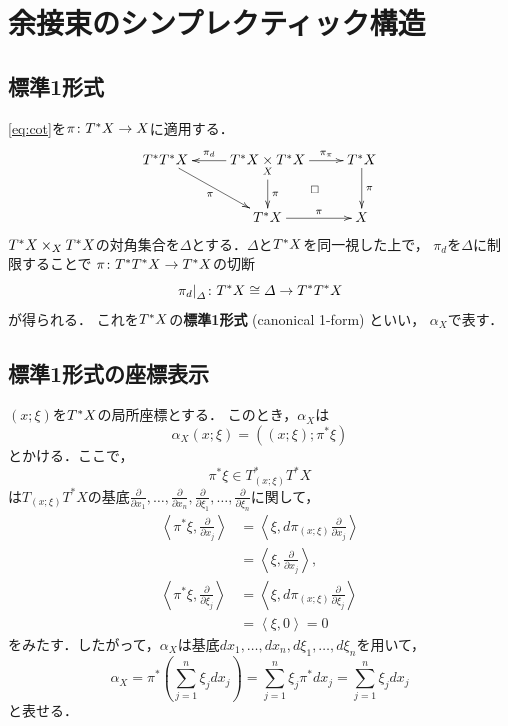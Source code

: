 \section{余接束のシンプレクティック構造}
\subsection*{標準1形式}

\eqref{eq:cot}を\(\pi\colon \cotb[X]\to X\)に適用する．
\begin{equation}\label{eq:cotcot}
    \vcenter{\xymatrix{
      T^{\ast}\cotb[X]
      \ar[rd]_-{\pi}
      &
      \cotb[X]\pb[X]\cotb[X]
      \ar[l]_-{\pi_{d}}
      \ar[r]^-{\pi_{\pi}}
      \ar[d]^-{\pi}
      \ar@{}[dr]|\square
      &
      \cotb[X]
      \ar[d]^-{\pi}
      \\
      &\cotb[X]\ar[r]^-{\pi}&X
}}\end{equation}
\(\cotb[X]\mathbin{\times_{X}}\cotb[X]\)の対角集合を\(
    \varDelta
\)とする．\(\varDelta\)と\(\cotb[X]\)を同一視した上で，
\(\pi_{d}\)を\(\varDelta\)に制限することで
\(\pi\colon\cotb[{\cotb[X]}]\to\cotb[X]\)の切断
\[
    \mres[\pi_{d}]{\varDelta}\colon
    \cotb[X]
    \cong\varDelta
    \to\cotb[{\cotb[X]}]
\]    
が得られる．
これを\(\cotb[X]\)の\textbf{標準1形式} (canonical 1-form) といい，
\(\alpha_X\)で表す．

\subsection*{標準1形式の座標表示}

\((x;\xi)\)を\(\cotb[X]\)の局所座標とする．
このとき，\(\alpha_X\)は
\[
    \alpha_{X}(x;\xi)=((x;\xi);\pi^{\ast}\xi)
\]
とかける．ここで，\[
    \pi^{\ast}\xi\in T^{\ast}_{(x;\xi)}T^{\ast}X
\]は\(T_{(x;\xi)}T^{\ast}X\)の基底\(
    \frac{\partial}{\partial x_{1}},
    \dots,
    \frac{\partial}{\partial x_{n}},
    \frac{\partial}{\partial \xi_{1}},
    \dots,
    \frac{\partial}{\partial \xi_{n}}
\)に関して，
\begin{align*}
    \left\langle \pi^{\ast}\xi, \frac{\partial}{\partial x_{j}}\right\rangle
    &=
    \left\langle \xi, d\pi_{(x;\xi)}\frac{\partial}{\partial x_{j}}\right\rangle\\
    &=
    \left\langle \xi, \frac{\partial}{\partial x_{j}}\right\rangle,\\
    \left\langle \pi^{\ast}\xi, \frac{\partial}{\partial \xi_{j}}\right\rangle
    &=
    \left\langle \xi, d\pi_{(x;\xi)}\frac{\partial}{\partial \xi_{j}}\right\rangle\\
    &=
    \left\langle \xi, 0\right\rangle=0
\end{align*}
をみたす．したがって，\(\alpha_X\)は基底\(dx_{1},\dots,dx_{n},d\xi_{1},\dots,d\xi_{n}\)を用いて，
\[
    \alpha_X
    =\pi^{\ast}\left(
        \sum_{j=1}^{n}\xi_{j}dx_{j}
    \right)
    =\sum_{j=1}^{n}\xi_{j}\pi^{\ast}dx_{j}
    =\sum_{j=1}^{n}\xi_{j}dx_{j}
\]
と表せる．

